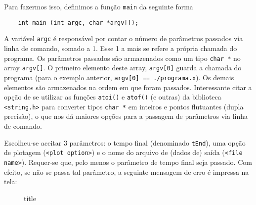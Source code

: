   Para fazermos isso, definimos a função \texttt{main} da seguinte forma
  \begin{lstlisting}
    int main (int argc, char *argv[]);
  \end{lstlisting}
  A variável \texttt{argc} é responsável por contar o número de parâmetros passados via linha de comando, somado a 1. Esse 1 a mais se refere a própria chamada do programa. Os parâmetros passados são armazenados como um tipo \texttt{char *} no array \texttt{argv[]}. O primeiro elemento deste array, \texttt{argv[0]} guarda a chamada do programa (para o exemplo anterior, \texttt{argv[0] == ./programa.x}). Os demais elementos são armazenados na ordem em que foram passados.
  Interessante citar a opção de se utilizar as funções \texttt{atoi()} e \texttt{atof()} (e outras) da biblioteca \texttt{<string.h>} para converter tipos \texttt{char *} em inteiros e pontos flutuantes (dupla precisão), o que nos dá maiores opções para a passagem de parâmetros via linha de comando.

  Escolheu-se aceitar 3 parâmetros: o tempo final (denominado \texttt{tEnd}), uma opção de plotagem (\texttt{<plot option>}) e o nome do arquivo de (dados de) saída (\texttt{<file name>}). Requer-se que, pelo menos o parâmetro de tempo final seja passado. Com efeito, se não se passa tal parâmetro, a seguinte mensagem de erro é impressa na tela:
  \begin{figure}[h]
    \caption{title}
  \end{figure}




